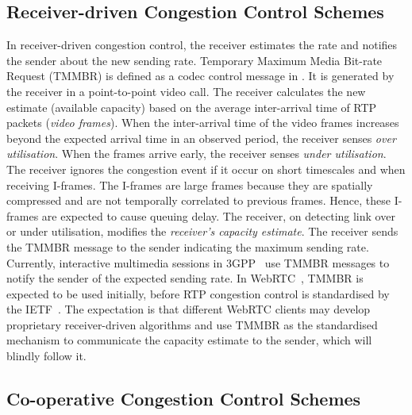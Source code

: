 \subsection{Receiver-driven Congestion Control Schemes}

In receiver-driven congestion control, the receiver estimates the rate and
notifies the sender about the new sending rate. Temporary Maximum Media 
Bit-rate Request (TMMBR) is defined as a codec control message in \cite{rfc5104}.
It is generated by the receiver in a point-to-point video call. The receiver
calculates the new estimate (available capacity) based on the average 
inter-arrival time of RTP packets (\emph{video frames}). When the inter-arrival time
of the video frames increases beyond the expected arrival time in an observed
period, the receiver senses \emph{over utilisation}. When the frames arrive early, the
receiver senses \emph{under utilisation}. The receiver ignores the congestion event 
if it occur on short timescales and when receiving I-frames. 
The I-frames are large frames because they are spatially compressed and
are not temporally correlated to previous frames. Hence, these I-frames are
expected to cause queuing delay. The receiver, on detecting link over
or under utilisation, modifies the \emph{receiver's capacity estimate}. 
The receiver sends the TMMBR message to the sender
indicating the maximum sending rate. Currently, interactive multimedia sessions
in 3GPP~\cite{3gpp.26.114} use TMMBR messages to notify the sender of the
expected sending rate. In WebRTC~\cite{jennings:2013:webrtc}, TMMBR is
expected to be used initially, before RTP congestion control is standardised
by the IETF~\cite{rtp-usage}. The expectation is that different WebRTC clients
may develop proprietary receiver-driven algorithms and use TMMBR as the
standardised mechanism to communicate the capacity estimate to the sender,
which will blindly follow it.


\subsection{Co-operative Congestion Control Schemes}
\label{cc:co-op}

